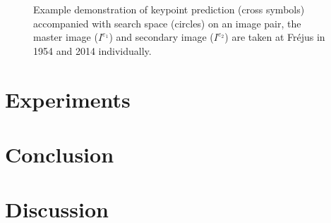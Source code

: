 \begin{figure}[htbp]
	\begin{center}
		\caption{Example demonstration of keypoint prediction (cross symbols) accompanied with search space (circles) on an image pair, the master image ($I^{e_1}$) and secondary image ($I^{e_2}$) are taken at Fr{\'e}jus in 1954 and 2014 individually.}
		\label{WorkflowPatch}
	\end{center}
\end{figure}



\section{Experiments}

\section{Conclusion}

\section{Discussion}
